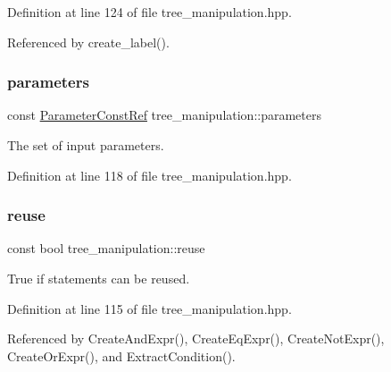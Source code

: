 Definition at line 124 of file tree\+\_\+manipulation.\+hpp.



Referenced by create\+\_\+label().

\mbox{\label{classtree__manipulation_a33e7af50148a33e3f8ef9621c094fa1a}} 
\subsubsection{\texorpdfstring{parameters}{parameters}}
{\footnotesize\ttfamily const \hyperlink{Parameter_8hpp_a37841774a6fcb479b597fdf8955eb4ea}{Parameter\+Const\+Ref} tree\+\_\+manipulation\+::parameters\hspace{0.3cm}{\ttfamily [private]}}



The set of input parameters. 



Definition at line 118 of file tree\+\_\+manipulation.\+hpp.

\mbox{\label{classtree__manipulation_ae8bc97e6e8bed52cff1080b44ea46ba4}} 
\subsubsection{\texorpdfstring{reuse}{reuse}}
{\footnotesize\ttfamily const bool tree\+\_\+manipulation\+::reuse\hspace{0.3cm}{\ttfamily [private]}}



True if statements can be reused. 



Definition at line 115 of file tree\+\_\+manipulation.\+hpp.



Referenced by Create\+And\+Expr(), Create\+Eq\+Expr(), Create\+Not\+Expr(), Create\+Or\+Expr(), and Extract\+Condition().

\mbox{\label{classtree__manipulation_aee245cc376915c8ec6cff7d8636aa411}} 
